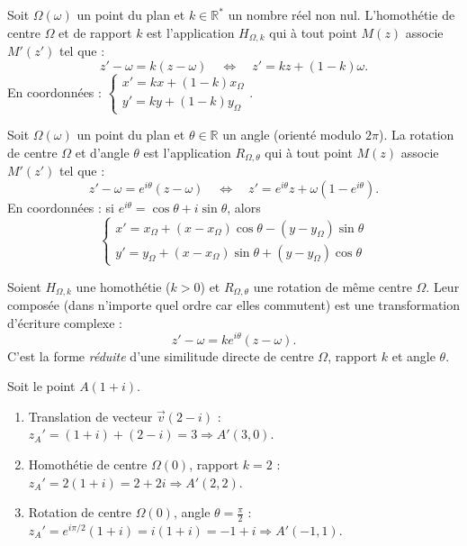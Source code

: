 \documentclass[11pt]{article}
\begin{document}
\begin{definition}
Soit $\Omega(\omega)$ un point du plan et $k \in \mathbb{R}^*$ un nombre r\'eel non nul. L'homoth\'etie de centre $\Omega$ et de rapport $k$ est l'application $H_{\Omega,k}$ qui \`a tout point $M(z)$ associe $M'(z')$ tel que :
\[
z' - \omega = k(z - \omega) \quad \iff \quad z' = kz + (1-k)\omega.
\]
En coordonn\'ees : $\begin{cases} x' = kx + (1-k)x_\Omega \\ y' = ky + (1-k)y_\Omega \end{cases}$.
\end{definition}

\begin{definition}[Rotation]
Soit $\Omega(\omega)$ un point du plan et $\theta \in \mathbb{R}$ un angle (orient\'e modulo $2\pi$). La rotation de centre $\Omega$ et d'angle $\theta$ est l'application $R_{\Omega,\theta}$ qui \`a tout point $M(z)$ associe $M'(z')$ tel que :
\[
z' - \omega = e^{i\theta}(z - \omega) \quad \iff \quad z' = e^{i\theta}z + \omega(1-e^{i\theta}).
\]
En coordonn\'ees : si $e^{i\theta} = \cos\theta + i\sin\theta$, alors
\[
\begin{cases}
x' = x_\Omega + (x-x_\Omega)\cos\theta - (y-y_\Omega)\sin\theta \\
y' = y_\Omega + (x-x_\Omega)\sin\theta + (y-y_\Omega)\cos\theta
\end{cases}
\]
\end{definition}

\begin{propriete}
Soient $H_{\Omega,k}$ une homoth\'etie ($k>0$) et $R_{\Omega,\theta}$ une rotation de m\^eme centre $\Omega$. Leur compos\'ee (dans n'importe quel ordre car elles commutent) est une transformation d'\'ecriture complexe :
\[
z' - \omega = k e^{i\theta}(z - \omega).
\]
C'est la forme \emph{r\'eduite} d'une similitude directe de centre $\Omega$, rapport $k$ et angle $\theta$.
\end{propriete}

\begin{exemplebox}
Soit le point $A(1+i)$.
\begin{enumerate}
\item Translation de vecteur $\vec{v}(2-i)$ : $z_A' = (1+i)+(2-i) = 3 \Rightarrow A'(3,0)$.
\item Homoth\'etie de centre $\Omega(0)$, rapport $k=2$ : $z_A' = 2(1+i) = 2+2i \Rightarrow A'(2,2)$.
\item Rotation de centre $\Omega(0)$, angle $\theta = \frac{\pi}{2}$ : $z_A' = e^{i\pi/2}(1+i) = i(1+i) = -1+i \Rightarrow A'(-1,1)$.
\end{enumerate}
\end{exemplebox}
\end{document}
